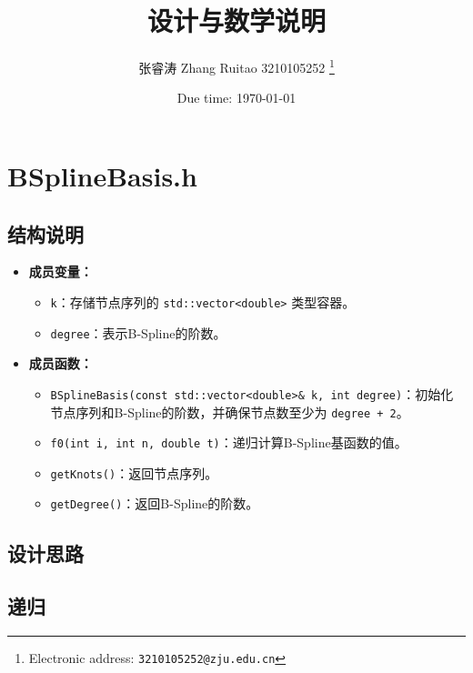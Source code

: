 \documentclass[a4paper]{article}
\begin{document}
\title{设计与数学说明}

\author{张睿涛 Zhang Ruitao 3210105252
  \thanks{Electronic address: \texttt{3210105252@zju.edu.cn}}}

\date{Due time: \today}

\maketitle

\section{BSplineBasis.h}
\subsection{结构说明}
\begin{itemize}
    \item \textbf{成员变量：}
    \begin{itemize}
        \item \texttt{k}：存储节点序列的 \texttt{std::vector<double>} 类型容器。
        \item \texttt{degree}：表示B-Spline的阶数。
    \end{itemize}
    \item \textbf{成员函数：}
    \begin{itemize}
        \item \texttt{BSplineBasis(const std::vector<double>& k, int degree)}：初始化节点序列和B-Spline的阶数，并确保节点数至少为 \texttt{degree + 2}。
        \item \texttt{f0(int i, int n, double t)}：递归计算B-Spline基函数的值。
        \item \texttt{getKnots()}：返回节点序列。
        \item \texttt{getDegree()}：返回B-Spline的阶数。
    \end{itemize}
\end{itemize}

\subsection{设计思路}

\subsection{递归}
\end{document}

